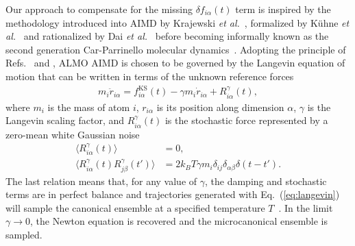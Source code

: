 \documentclass[aps,prl,reprint,amsmath,amssymb]{revtex4-1}
\begin{document}
Our approach to compensate for the missing $\delta f_{i\alpha}(t)$ term is inspired by the methodology introduced into AIMD by Krajewski \emph{et al.}~\cite{Krajewski}, formalized by K\"uhne \emph{et al.}~\cite{a:2ndcpmd} and rationalized by Dai \emph{et al.}~\cite{a:langevin-why} before becoming informally known as the second generation Car-Parrinello molecular dynamics~\cite{Kuhne2013}. 
Adopting the principle of Refs.~ and , ALMO AIMD is chosen to be governed by the Langevin equation of motion that can be written in terms of the unknown reference forces
%
\begin{align}
\label{eq:langevin}
m_i \ddot{r}_{i\alpha} = f^{\text{KS}}_{i\alpha}(t) - \gamma m_i \dot{r}_{i\alpha} + R^{\gamma}_{i\alpha} (t),
\end{align}
%
where $m_i$ is the mass of atom $i$, $r_{i\alpha}$ is its position along dimension $\alpha$, $\gamma$ is the Langevin scaling factor, and $R^{\gamma}_{i\alpha} (t)$ is the stochastic force represented by a zero-mean white Gaussian noise %
%
\begin{align}
\label{eq:stochastic}
\langle R^{\gamma}_{i\alpha} (t) \rangle &= 0, \\
\langle R^{\gamma}_{i\alpha} (t)  R^{\gamma}_{j\beta} (t') \rangle &= 2 k_B T \gamma m_i \delta_{ij} \delta_{\alpha\beta} \delta(t-t').
\end{align}
% 
The last relation means that, for any value of $\gamma$, the damping and stochastic terms are in perfect balance and trajectories generated with Eq.~(\ref{eq:langevin}) will sample the canonical ensemble at a specified temperature $T$~\cite{a:Kubo-1986}. 
In the limit $\gamma \rightarrow 0$, the Newton equation is recovered and the microcanonical ensemble is sampled. 
\end{document}
